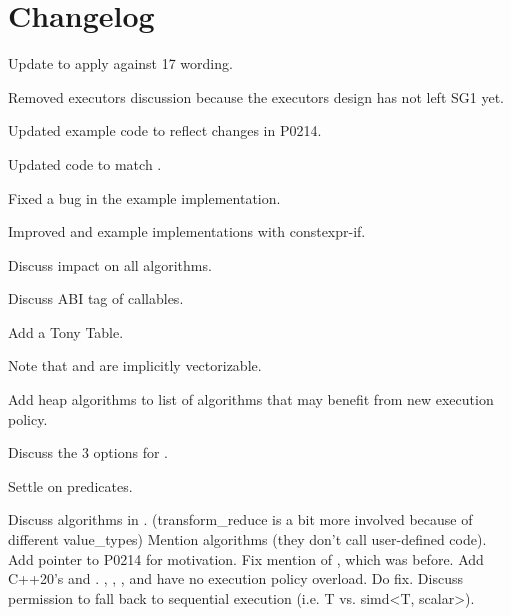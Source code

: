 \section{Changelog}
\begin{revision}
  \item Update to apply against \CC{}17 wording.
  \item Removed executors discussion because the executors design has not left SG1 yet.
  \item Updated example code to reflect changes in P0214.
\end{revision}

\begin{revision}
  \item Updated code to match \cite{N4744}.
  \item Fixed a bug in the  example implementation.
  \item Improved  and  example implementations with constexpr-if.
  \item Discuss impact on all algorithms.
\end{revision}

\begin{revision}
  \item Discuss ABI tag of  callables.
  \item Add a Tony Table.
  \item Note that  and  are implicitly vectorizable.
\end{revision}

\begin{revision}
  \item Add heap algorithms to list of algorithms that may benefit from new execution policy.
  \item Discuss the 3 options for .
  \item Settle on  predicates.
\end{revision}

\begin{revision}
  \todo Discuss algorithms in . (transform_reduce is a bit more involved because of different value_types)
  \todo Mention  algorithms (they don't call user-defined code).
  \todo Add pointer to P0214 for motivation.
  \todo Fix mention of , which was  before.
  \todo Add C++20's  and .
  \todo {}, , , and  have no execution policy overload. Do fix.
  \todo Discuss permission to fall back to sequential execution (i.e. T vs. simd<T, scalar>).
\end{revision}

